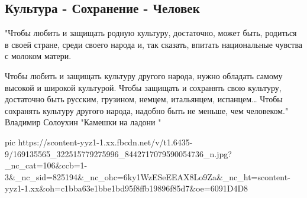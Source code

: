  
 
 
 
 

\subsection{Культура - Сохранение - Человек}

"Чтобы любить и защищать родную культуру, достаточно, может быть, родиться в
своей стране, среди своего народа и, так сказать, впитать национальные
чувства с молоком матери.

Чтобы любить и защищать культуру другого народа, нужно обладать самому высокой и широкой культурой.
Чтобы защищать и сохранять свою культуру, достаточно быть русским, грузином, немцем, итальянцем, испанцем…
Чтобы сохранять культуру другого народа, надобно быть не меньше, чем человеком."
Владимир Солоухин 
"Камешки на ладони "


\ifcmt
  pic https://scontent-yyz1-1.xx.fbcdn.net/v/t1.6435-9/169135565_322515779275996_8442717079590054736_n.jpg?_nc_cat=106&ccb=1-3&_nc_sid=825194&_nc_ohc=6ky1WzESeEEAX8Lo9Za&_nc_ht=scontent-yyz1-1.xx&oh=c1bba63e1bbe1bd95f8ffb19896f85d7&oe=6091D4D8
\fi

